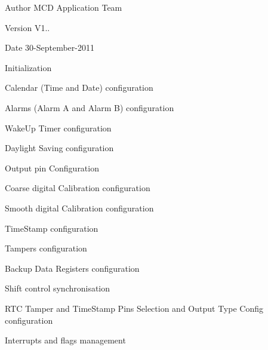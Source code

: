 \begin{DoxyAuthor}{Author}
M\+CD Application Team 
\end{DoxyAuthor}
\begin{DoxyVersion}{Version}
V1.. 
\end{DoxyVersion}
\begin{DoxyDate}{Date}
30-\/\+September-\/2011
\begin{DoxyItemize}
\item Initialization
\item Calendar (Time and Date) configuration
\item Alarms (Alarm A and Alarm B) configuration
\item Wake\+Up Timer configuration
\item Daylight Saving configuration
\item Output pin Configuration
\item Coarse digital Calibration configuration
\item Smooth digital Calibration configuration
\item Time\+Stamp configuration
\item Tampers configuration
\item Backup Data Registers configuration
\item Shift control synchronisation
\item R\+TC Tamper and Time\+Stamp Pins Selection and Output Type Config configuration
\item Interrupts and flags management
\end{DoxyItemize}
\end{DoxyDate}
